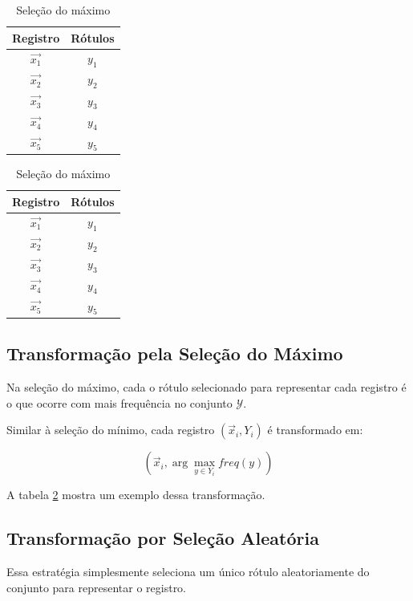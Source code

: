 \documentclass[runningheads,a4paper]{llncs}
\begin{document}
\begin{table}
\parbox{.45\linewidth} {
	\centering
	\begin{tabular}{| c | c |}
		\hline
		\textbf{Registro} & \textbf{Rótulos} \\
		\hline
		$\vec{x_1}$ & $y_1$ \\
		\hline
		$\vec{x_2}$ & $y_2$ \\
		\hline
		$\vec{x_3}$ & $y_3$ \\
		\hline
		$\vec{x_4}$ & $y_4$ \\
		\hline
		$\vec{x_5}$ & $y_5$ \\
		\hline
	\end{tabular}
	\caption{Seleção do mínimo}
	\label{tab:exselmin}
}
\parbox{.45\linewidth}{
	\centering
	\begin{tabular}{| c | c |}
		\hline
		\textbf{Registro} & \textbf{Rótulos} \\
		\hline
		$\vec{x_1}$ & $y_1$ \\
		\hline
		$\vec{x_2}$ & $y_2$ \\
		\hline
		$\vec{x_3}$ & $y_3$ \\
		\hline
		$\vec{x_4}$ & $y_4$ \\
		\hline
		$\vec{x_5}$ & $y_5$ \\
		\hline
	\end{tabular}
	\caption{Seleção do máximo}
	\label{tab:exselmax}
}
\end{table}

\subsection{Transformação pela Seleção do Máximo} \label{subsec:selecaomaximo}

Na seleção do máximo, cada o rótulo selecionado para representar cada registro é o que ocorre com mais frequência no conjunto $\mathcal{Y}$.

Similar à seleção do mínimo, cada registro $(\vec{x}_i, Y_i)$ é transformado em:

$$(\vec{x}_i, \arg \max_{y \in Y_i} freq(y))$$

A tabela \ref{tab:exselmax} mostra um exemplo dessa transformação.

\subsection{Transformação por Seleção Aleatória} \label{subsec:selecaoaleatoria}

Essa estratégia simplesmente seleciona um único rótulo aleatoriamente do conjunto para representar o registro.
\end{document}
